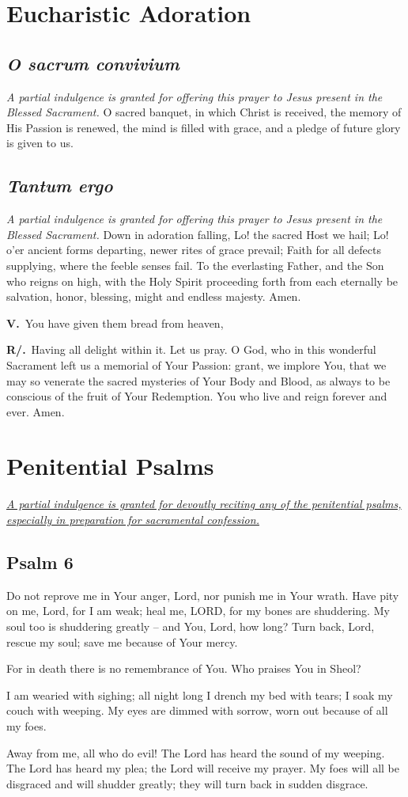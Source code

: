 \documentclass[12pt]{article}
\newcommand{\prayersection}[1]{\section{#1}}
\newcommand{\prayertitle}[1]{\subsection{#1}}
\newcommand{\indulgencedprayertitle}[1]{\prayertitle{#1 \protect\kreuz}}
\newcommand{\foreign}[1]{\textsl{#1}}
\newcommand{\note}[1]{{\small{\textsl{#1}}}\newline}
\newcommand{\linkednote}[2]{\hyperlink{#1}{\note{#2}}}
\newcommand{\versicle}{\textbf{V.}}
\newcommand{\response}{\textbf{R/.}}
\begin{document}
\newpage

\prayersection{Eucharistic Adoration}
\prayertitle{\foreign{O sacrum convivium}}
\note{A partial indulgence is granted for offering this prayer to Jesus present in the Blessed Sacrament.}
O sacred banquet, in which Christ is received, the memory of His Passion is renewed, the mind is filled with grace, and a pledge of future glory is given to us.

\prayertitle{\foreign{Tantum ergo}}
\note{A partial indulgence is granted for offering this prayer to Jesus present in the Blessed Sacrament.}
Down in adoration falling,
Lo! the sacred Host we hail;
Lo! o'er ancient forms departing,
newer rites of grace prevail;
Faith for all defects supplying,
where the feeble senses fail.
To the everlasting Father,
and the Son who reigns on high,
with the Holy Spirit proceeding
forth from each eternally
be salvation, honor, blessing,
might and endless majesty.
Amen.

\versicle\ You have given them bread from heaven,

\response\ Having all delight within it.
Let us pray.
O God, who in this wonderful Sacrament left us a memorial of Your Passion:
grant, we implore You, that we may so venerate the sacred mysteries of Your Body and Blood, as always to be conscious of the fruit of Your Redemption.
You who live and reign forever and ever.
Amen.

\newpage

\prayersection{Penitential Psalms}
\linkednote{grant9}{A partial indulgence is granted for devoutly reciting any of the penitential psalms, especially in preparation for sacramental confession.}
\indulgencedprayertitle{Psalm 6}
Do not reprove me in Your anger, Lord,
nor punish me in Your wrath.
Have pity on me, Lord, for I am weak;
heal me, LORD, for my bones are shuddering.
My soul too is shuddering greatly -- and You, Lord, how long?
Turn back, Lord, rescue my soul;
save me because of Your mercy.

For in death there is no remembrance of You.
Who praises You in Sheol?

I am wearied with sighing;
all night long I drench my bed with tears;
I soak my couch with weeping.
My eyes are dimmed with sorrow, worn out because of all my foes.

Away from me, all who do evil!
The Lord has heard the sound of my weeping.
The Lord has heard my plea;
the Lord will receive my prayer.
My foes will all be disgraced and will shudder greatly;
they will turn back in sudden disgrace.
\end{document}
